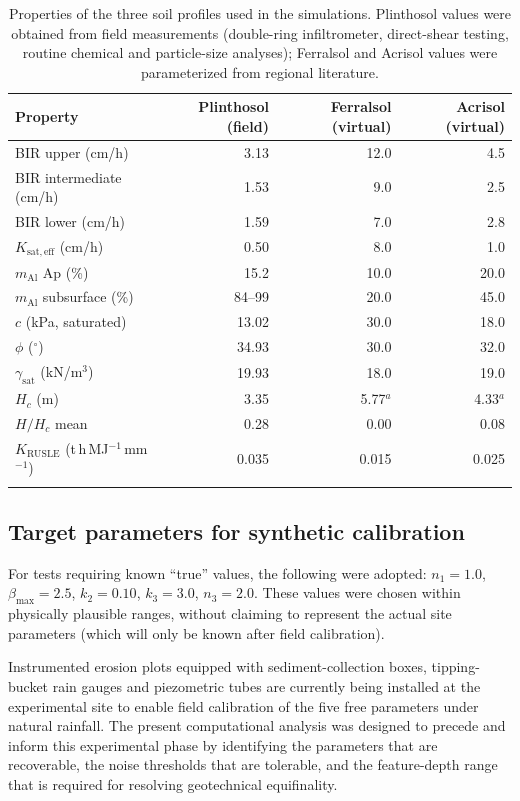 \documentclass[pdflatex,sn-basic,referee,lineno]{sn-jnl}
\begin{document}
\begin{table}[htbp]
\centering
\caption{Properties of the three soil profiles used in the simulations. Plinthosol values were obtained from field measurements (double-ring infiltrometer, direct-shear testing, routine chemical and particle-size analyses); Ferralsol and Acrisol values were parameterized from regional literature.}
\label{tab:profiles}
\small
\begin{tabular}{@{}l r r r@{}}
\toprule
Property & Plinthosol (field) & Ferralsol (virtual) & Acrisol (virtual) \\
\midrule
BIR upper (cm/h) & 3.13 & 12.0 & 4.5 \\
BIR intermediate (cm/h) & 1.53 & 9.0 & 2.5 \\
BIR lower (cm/h) & 1.59 & 7.0 & 2.8 \\
$K_{\mathrm{sat,eff}}$ (cm/h) & 0.50 & 8.0 & 1.0 \\
$m_{\mathrm{Al}}$ Ap (\%) & 15.2 & 10.0 & 20.0 \\
$m_{\mathrm{Al}}$ subsurface (\%) & 84--99 & 20.0 & 45.0 \\
$c$ (kPa, saturated) & 13.02 & 30.0 & 18.0 \\
$\phi$ ($^\circ$) & 34.93 & 30.0 & 32.0 \\
$\gamma_{\mathrm{sat}}$ (kN/m$^3$) & 19.93 & 18.0 & 19.0 \\
$H_c$ (m) & 3.35 & 5.77$^a$ & 4.33$^a$ \\
$H/H_c$ mean & 0.28 & 0.00 & 0.08 \\
$K_{\mathrm{RUSLE}}$ (t\,h\,MJ$^{-1}$\,mm$^{-1}$) & 0.035 & 0.015 & 0.025 \\
\botrule
\end{tabular}
\end{table}

\subsection{Target parameters for synthetic calibration}

For tests requiring known ``true'' values, the following were adopted: $n_1 = 1.0$, $\beta_{\max} = 2.5$, $k_2 = 0.10$, $k_3 = 3.0$, $n_3 = 2.0$. These values were chosen within physically plausible ranges, without claiming to represent the actual site parameters (which will only be known after field calibration).

Instrumented erosion plots equipped with sediment-collection boxes, tipping-bucket rain gauges and piezometric tubes are currently being installed at the experimental site to enable field calibration of the five free parameters under natural rainfall. The present computational analysis was designed to precede and inform this experimental phase by identifying the parameters that are recoverable, the noise thresholds that are tolerable, and the feature-depth range that is required for resolving geotechnical equifinality.
\end{document}
